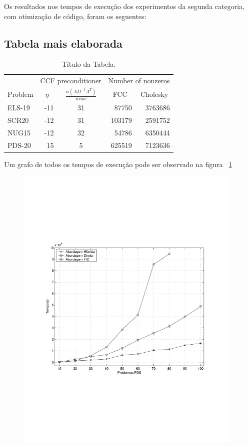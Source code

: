 \documentclass[a4paper,12pt,fleqn]{article}
\begin{document}
Os resultados nos tempos de execução dos experimentos da segunda categoria, com otimização de código, foram os seguentes: 

\subsection{Tabela mais elaborada}
\begin{table}[htb]
\begin{center}
\begin{tabular}{|l|r|c|r|r|} \hline
            & \multicolumn{2}{|c|}{{CCF preconditioner}} & \multicolumn{2}{|c|}{{Number of nonzeros}} \\ \cline{2-5}
{Problem}   & \multicolumn{1}{|c|}{$\eta$}  & \multicolumn{1}{|c|}{$ \frac{n(AD^{-1}A^T)}{nrow}$} & \multicolumn{1}{|c|}{FCC} & \multicolumn{1}{|c|}{Cholesky}  \\ \hline \hline
ELS-19    &  -11 & 31 &  87750  & 3763686  \\\hline
SCR20     &  -12 & 31 &  103179 & 2591752  \\\hline
NUG15     &  -12 & 32 &  54786  & 6350444 \\\hline
PDS-20    &   15 & 5  &  625519 & 7123636\\\hline
\end{tabular}
\caption{Título da Tabela.}   
\label{tabn2}
\end{center}
\end{table}

Um grafo de todos os tempos de execução pode ser observado na figura ~\ref{fig:pdsmodel} 
 
\begin{figure}[htb] 
\centering 
 
\includegraphics[height=14cm]{Images/figura} 
\label{fig:pdsmodel} 
\end{figure} 
 
\end{document}
